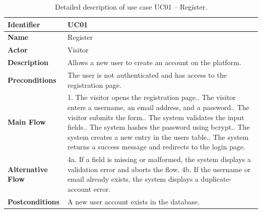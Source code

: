 \begin{table}[H]
\centering
\renewcommand{\arraystretch}{1.3}
\begin{tabular}{|p{3.5cm}|p{10cm}|}
\hline
\textbf{Identifier} & UC01 \\
\hline
\textbf{Name} & Register \\
\hline
\textbf{Actor} & Visitor \\
\hline
\textbf{Description} & Allows a new user to create an account on the platform. \\
\hline
\textbf{Preconditions} & The user is not authenticated and has access to the registration page. \\
\hline
\textbf{Main Flow} & 
1. The visitor opens the registration page.\newline
2. The visitor enters a username, an email address, and a password.\newline
3. The visitor submits the form.\newline
4. The system validates the input fields.\newline
5. The system hashes the password using bcrypt.\newline
6. The system creates a new entry in the users table.\newline
7. The system returns a success message and redirects to the login page. \\
\hline
\textbf{Alternative Flow} & 
4a. If a field is missing or malformed, the system displays a validation error and aborts the flow.\newline
4b. If the username or email already exists, the system displays a duplicate-account error. \\
\hline
\textbf{Postconditions} & A new user account exists in the database. \\
\hline
\end{tabular}
\caption{Detailed description of use case UC01 -- Register.}
\label{tab:uc01}
\end{table}

